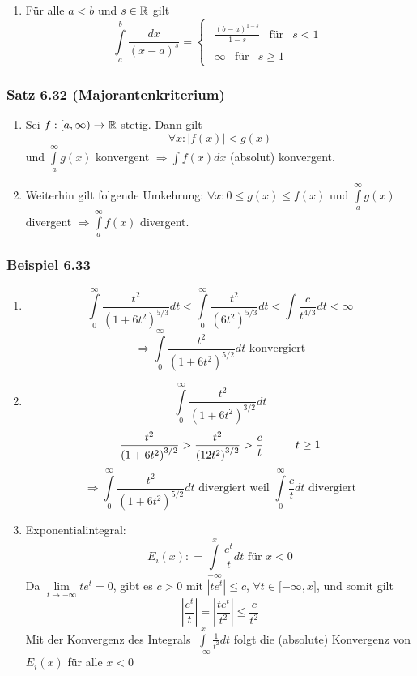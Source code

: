 \begin{enumerate}
\begin{enumerate}
\item Für alle $a<b$ und $s\in\mathbb{R}$ gilt \[\int\limits_a^b {\frac{{dx}}{{{{(x - a)}^s}}}}  = \left\{ {\begin{array}{*{20}{c}}
{\begin{array}{*{20}{c}}
{\frac{{{{(b - a)}^{1 - s}}}}{{1 - s}}}&\text{für}&{s < 1}
\end{array}}\\
{\begin{array}{*{20}{c}}
\infty &{{\text{für}}}&{s \ge 1}
\end{array}}
\end{array}} \right.\]
\end{enumerate}
\end{enumerate}
\subsubsection*{Satz 6.32 (Majorantenkriterium)}
\begin{enumerate}[\indent a)]
\item Sei $f:\lbrack a,\infty )\to\mathbb{R}$ stetig. Dann gilt \[\forall x:\left| f(x)\right| <g(x)\] und $\int\limits_a^\infty  {g(x)}$ konvergent $\Rightarrow \int {f(x)dx} $ (absolut) konvergent.
\item Weiterhin gilt folgende Umkehrung: $\forall x:0\leq g(x)\leq f(x)$ und $\int\limits_a^\infty  {g(x)}$ divergent $\Rightarrow \int\limits_a^\infty  {f(x)}$ divergent.
\end{enumerate}

\subsubsection*{Beispiel 6.33}
\begin{enumerate}
\item \[\int\limits_0^\infty  {\frac{{{t^2}}}{{{{\left( {1 + 6{t^2}} \right)}^{5/3}}}}dt}  < \int\limits_0^\infty  {\frac{{{t^2}}}{{{{\left( {6{t^2}} \right)}^{5/3}}}}dt}  < \int {\frac{c}{{{t^{4/3}}}}dt < \infty } \]
\[\Rightarrow\int\limits_0^\infty  {\frac{{{t^2}}}{{{{\left( {1 + 6{t^2}} \right)}^{5/2}}}}dt} \text{ konvergiert}\]
\item \[\int\limits_0^\infty  {\frac{{{t^2}}}{{{{\left( {1 + 6{t^2}} \right)}^{3/2}}}}dt} \]
\[\frac{{{t^2}}}{{{{\left( {1 + 6{t^2}} \right)}^{3/2}}}} > \frac{{{t^2}}}{{{{\left( {12{t^2}} \right)}^{3/2}}}} > \frac{c}{t}\text{\hspace{10mm}}t\geq 1\]
\[\Rightarrow\int\limits_0^\infty  {\frac{{{t^2}}}{{{{\left( {1 + 6{t^2}} \right)}^{5/2}}}}} dt\text{ divergiert weil }\int\limits_0^\infty  {\frac{c}{t}} dt\text{ divergiert}\]
\item Exponentialintegral:
\[{E_i}(x): = \int\limits_{ - \infty }^x  {\frac{{{e^t}}}{t}dt} \text{ für }x<0\]
Da $\mathop {\lim }\limits_{t \to  - \infty } t{e^t} = 0$, gibt es $c>0$ mit $\left| {t{e^t}} \right| \le c$, $\forall t\in\lbrack -\infty ,x\rbrack$, und somit gilt \[\left| {\frac{{{e^t}}}{t}} \right| = \left| {\frac{{t{e^t}}}{{{t^2}}}} \right| \le \frac{c}{{{t^2}}}\] Mit der Konvergenz des Integrals $\int\limits_{ - \infty }^x {\frac{1}{{{t^2}}}dt} $ folgt die (absolute) Konvergenz von $E_i(x)$ für alle $x<0$
\end{enumerate}
